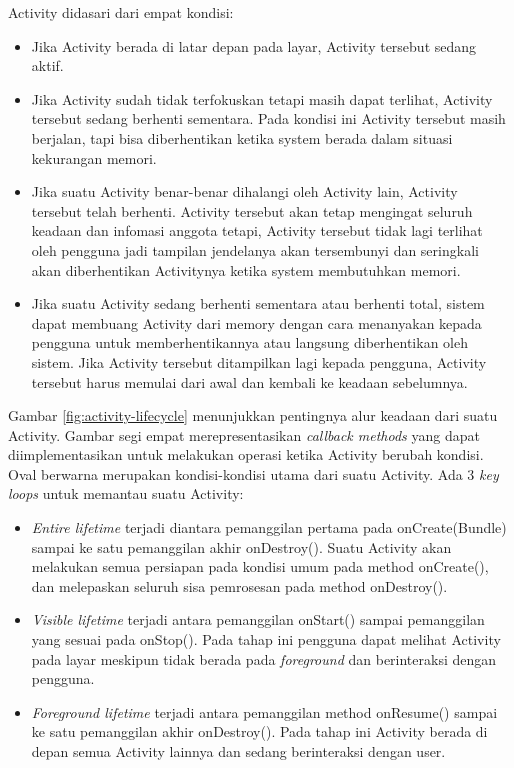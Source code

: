 Activity didasari dari empat kondisi:
\begin{itemize}
	\item Jika Activity berada di latar depan pada layar, Activity tersebut sedang aktif.
	\item Jika Activity sudah tidak terfokuskan tetapi masih dapat terlihat, Activity tersebut sedang berhenti sementara. Pada kondisi ini Activity tersebut masih berjalan, tapi bisa diberhentikan ketika system berada dalam situasi kekurangan memori.
	\item Jika suatu Activity benar-benar dihalangi oleh Activity lain, Activity tersebut telah berhenti. Activity tersebut akan tetap mengingat seluruh keadaan dan infomasi anggota tetapi, Activity tersebut tidak lagi terlihat oleh pengguna jadi tampilan jendelanya akan tersembunyi dan seringkali akan diberhentikan Activitynya ketika system membutuhkan memori.
	\item Jika suatu Activity sedang berhenti sementara atau berhenti total, sistem dapat membuang Activity dari memory dengan cara menanyakan kepada pengguna untuk memberhentikannya atau langsung diberhentikan oleh sistem. Jika Activity tersebut ditampilkan lagi kepada pengguna, Activity tersebut harus memulai dari awal dan kembali ke keadaan sebelumnya.
\end{itemize}
Gambar \ref{fig:activity-lifecycle} menunjukkan pentingnya alur keadaan dari suatu Activity. Gambar segi empat merepresentasikan \textit{callback methods} yang dapat diimplementasikan untuk melakukan operasi ketika Activity berubah kondisi. Oval berwarna merupakan kondisi-kondisi utama dari suatu Activity.
Ada 3 \textit{key loops} untuk memantau suatu Activity:
\begin{itemize}
	\item \textit{Entire lifetime} terjadi diantara pemanggilan pertama pada onCreate(Bundle) sampai ke satu pemanggilan akhir onDestroy(). Suatu Activity akan melakukan semua persiapan pada kondisi umum pada method onCreate(), dan melepaskan seluruh sisa pemrosesan pada method onDestroy().
	\item \textit{Visible lifetime} terjadi antara pemanggilan onStart() sampai pemanggilan yang sesuai pada onStop(). Pada tahap ini pengguna dapat melihat Activity pada layar meskipun tidak berada pada \textit{foreground} dan berinteraksi dengan pengguna.
	\item \textit{Foreground lifetime} terjadi antara pemanggilan method onResume() sampai ke satu pemanggilan akhir onDestroy(). Pada tahap ini Activity berada di depan semua Activity lainnya dan sedang berinteraksi dengan user.
\end{itemize}


